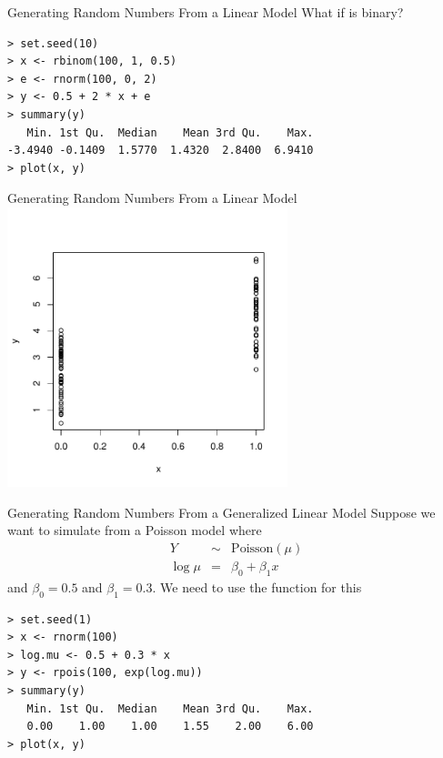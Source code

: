 \documentclass[aspectratio=169]{beamer}
\begin{document}
\begin{frame}[fragile]{Generating Random Numbers From a Linear Model}
What if  is binary?
\begin{verbatim}
> set.seed(10)
> x <- rbinom(100, 1, 0.5)
> e <- rnorm(100, 0, 2)
> y <- 0.5 + 2 * x + e
> summary(y)
   Min. 1st Qu.  Median    Mean 3rd Qu.    Max. 
-3.4940 -0.1409  1.5770  1.4320  2.8400  6.9410 
> plot(x, y)
\end{verbatim}
\end{frame}

\begin{frame}[fragile]{Generating Random Numbers From a Linear Model}
\includegraphics[height=3.2in]{binarylinearmodelsim}
\end{frame}

\begin{frame}[fragile]{Generating Random Numbers From a Generalized
    Linear Model}
Suppose we want to simulate from a Poisson model where
\begin{eqnarray*}
Y & \sim & \text{Poisson}(\mu)\\
\log\mu & = & \beta_0 + \beta_1 x
\end{eqnarray*}
and $\beta_0 = 0.5$ and $\beta_1 = 0.3$.  We need to use the
 function for this
\begin{verbatim}
> set.seed(1)
> x <- rnorm(100)
> log.mu <- 0.5 + 0.3 * x
> y <- rpois(100, exp(log.mu))
> summary(y)
   Min. 1st Qu.  Median    Mean 3rd Qu.    Max. 
   0.00    1.00    1.00    1.55    2.00    6.00 
> plot(x, y)
\end{verbatim}
\end{frame}
\end{document}
